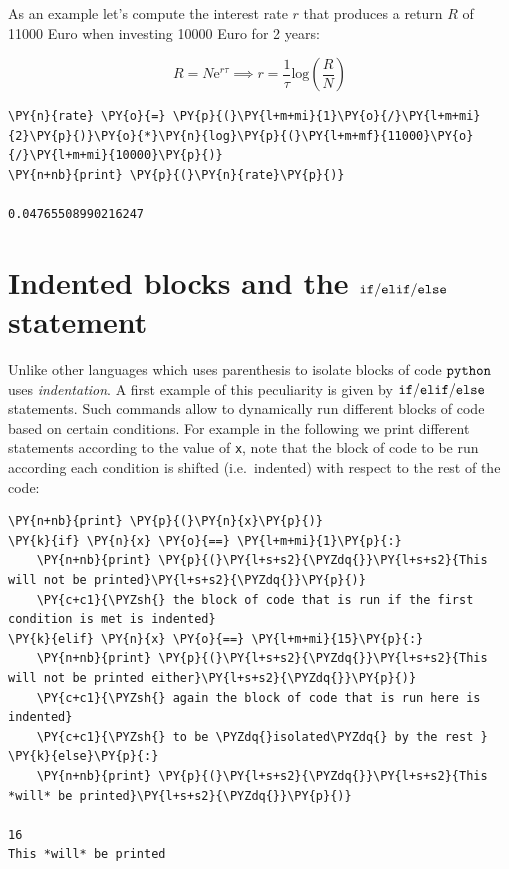 As an example let's compute the interest rate \(r\) that produces a return \(R\) of 11000 Euro when investing 10000 Euro for 2 years:

\[R = N\mathrm{e}^{r\tau} \implies r = \frac{1}{\tau} \mathrm{log}(\frac{R}{N})\]

\begin{tcolorbox}[breakable, size=fbox, boxrule=1pt, pad at break*=1mm, colback=cellbackground, colframe=cellborder]            
\begin{Verbatim}[commandchars=\\\{\}]
\PY{n}{rate} \PY{o}{=} \PY{p}{(}\PY{l+m+mi}{1}\PY{o}{/}\PY{l+m+mi}{2}\PY{p}{)}\PY{o}{*}\PY{n}{log}\PY{p}{(}\PY{l+m+mf}{11000}\PY{o}{/}\PY{l+m+mi}{10000}\PY{p}{)}
\PY{n+nb}{print} \PY{p}{(}\PY{n}{rate}\PY{p}{)}

0.04765508990216247
\end{Verbatim}
\end{tcolorbox}

\section{Indented blocks and the $\tt{if/elif/else}$ statement}\label{indented-blocks-and-the-ttifelse-statement}

Unlike other languages which uses parenthesis to isolate blocks of code $\tt{python}$ uses \emph{indentation}. A first example of this peculiarity is given by $\tt{if/elif/else}$ statements. Such commands allow to dynamically run different blocks of code based on certain conditions. For example in the following we print different statements according to the value of \texttt{x}, note that the block of code to be run according each condition is shifted (i.e.~indented) with respect to the rest of the code:

\begin{tcolorbox}[breakable, size=fbox, boxrule=1pt, pad at break*=1mm, colback=cellbackground, colframe=cellborder]            
\begin{Verbatim}[commandchars=\\\{\}]
\PY{n+nb}{print} \PY{p}{(}\PY{n}{x}\PY{p}{)}
\PY{k}{if} \PY{n}{x} \PY{o}{==} \PY{l+m+mi}{1}\PY{p}{:} 
    \PY{n+nb}{print} \PY{p}{(}\PY{l+s+s2}{\PYZdq{}}\PY{l+s+s2}{This will not be printed}\PY{l+s+s2}{\PYZdq{}}\PY{p}{)} 
    \PY{c+c1}{\PYZsh{} the block of code that is run if the first condition is met is indented}
\PY{k}{elif} \PY{n}{x} \PY{o}{==} \PY{l+m+mi}{15}\PY{p}{:}
    \PY{n+nb}{print} \PY{p}{(}\PY{l+s+s2}{\PYZdq{}}\PY{l+s+s2}{This will not be printed either}\PY{l+s+s2}{\PYZdq{}}\PY{p}{)}
    \PY{c+c1}{\PYZsh{} again the block of code that is run here is indented}
    \PY{c+c1}{\PYZsh{} to be \PYZdq{}isolated\PYZdq{} by the rest }
\PY{k}{else}\PY{p}{:}
    \PY{n+nb}{print} \PY{p}{(}\PY{l+s+s2}{\PYZdq{}}\PY{l+s+s2}{This *will* be printed}\PY{l+s+s2}{\PYZdq{}}\PY{p}{)}

16
This *will* be printed
\end{Verbatim}
\end{tcolorbox}

